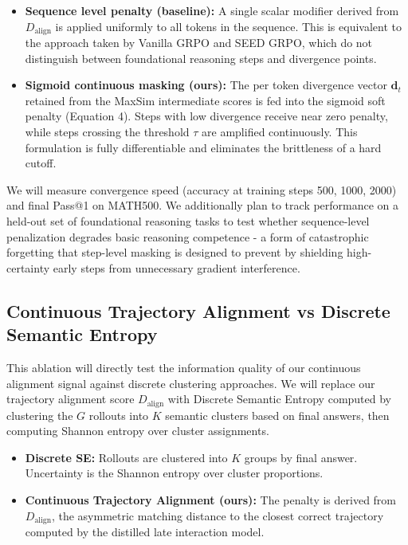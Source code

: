 \documentclass[conference]{IEEEtran}
\begin{document}
\begin{itemize}
    \item \textbf{Sequence level penalty (baseline):} A single scalar modifier derived from $D_{\mathrm{align}}$ is applied uniformly to all tokens in the sequence. This is equivalent to the approach taken by Vanilla GRPO and SEED GRPO, which do not distinguish between foundational reasoning steps and divergence points.
    \item \textbf{Sigmoid continuous masking (ours):} The per token divergence vector $\mathbf{d}_t$ retained from the MaxSim intermediate scores is fed into the sigmoid soft penalty (Equation 4). Steps with low divergence receive near zero penalty, while steps crossing the threshold $\tau$ are amplified continuously. This formulation is fully differentiable and eliminates the brittleness of a hard cutoff.
\end{itemize}

We will measure convergence speed (accuracy at training steps 500, 1000, 2000) and final Pass@1 on MATH500. We additionally plan to track performance on a held-out set of foundational reasoning tasks to test whether sequence-level penalization degrades basic reasoning competence - a form of catastrophic forgetting that step-level masking is designed to prevent by shielding high-certainty early steps from unnecessary gradient interference.

\subsection{Continuous Trajectory Alignment vs Discrete Semantic Entropy}

This ablation will directly test the information quality of our continuous alignment signal against discrete clustering approaches. We will replace our trajectory alignment score $D_{\mathrm{align}}$ with Discrete Semantic Entropy computed by clustering the $G$ rollouts into $K$ semantic clusters based on final answers, then computing Shannon entropy over cluster assignments.

\begin{itemize}
    \item \textbf{Discrete SE:} Rollouts are clustered into $K$ groups by final answer. Uncertainty is the Shannon entropy over cluster proportions.
    \item \textbf{Continuous Trajectory Alignment (ours):} The penalty is derived from $D_{\mathrm{align}}$, the asymmetric matching distance to the closest correct trajectory computed by the distilled late interaction model.
\end{itemize}
\end{document}
